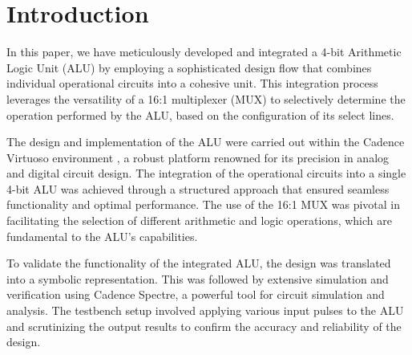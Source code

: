 \documentclass[conference]{IEEEtran}
\begin{document}
\section{Introduction}\label{A}
In this paper, we have meticulously developed and integrated a 4-bit Arithmetic Logic Unit (ALU) by employing a sophisticated design flow that combines individual operational circuits into a cohesive unit. This integration process leverages the versatility of a 16:1 multiplexer (MUX) to selectively determine the operation performed by the ALU, based on the configuration of its select lines. 

The design and implementation of the ALU were carried out within the Cadence Virtuoso environment \cite{b6}, a robust platform renowned for its precision in analog and digital circuit design. The integration of the operational circuits into a single 4-bit ALU was achieved through a structured approach that ensured seamless functionality and optimal performance. The use of the 16:1 MUX was pivotal in facilitating the selection of different arithmetic and logic operations\cite{b4}, which are fundamental to the ALU's capabilities.

To validate the functionality of the integrated ALU, the design was translated into a symbolic representation. This was followed by extensive simulation and verification using Cadence Spectre, a powerful tool for circuit simulation and analysis. The testbench setup involved applying various input pulses to the ALU and scrutinizing the output results to confirm the accuracy and reliability of the design.
\end{document}

